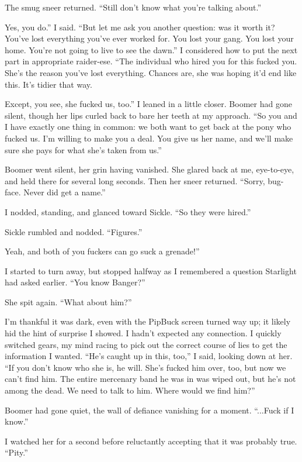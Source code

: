 The smug sneer returned. “Still don’t know what you’re talking about.”

\leavevmode{}Yes, you do.” I said. “But let me ask you another question: was it worth it? You’ve lost everything you’ve ever worked for. You lost your gang. You lost your home. You’re not going to live to see the dawn.” I considered how to put the next part in appropriate raider-ese. “The individual who hired you for this fucked you. She’s the reason you’ve lost everything. Chances are, she was hoping it’d end like this. It’s tidier that way.

\leavevmode{}Except, you see, she fucked us, too.” I leaned in a little closer. Boomer had gone silent, though her lips curled back to bare her teeth at my approach. “So you and I have exactly one thing in common: we both want to get back at the pony who fucked us. I’m willing to make you a deal. You give us her name, and we’ll make sure she pays for what she’s taken from us.”

Boomer went silent, her grin having vanished. She glared back at me, eye-to-eye, and held there for several long seconds. Then her sneer returned. “Sorry, bug-face. Never did get a name.”

I nodded, standing, and glanced toward Sickle. “So they were hired.”

Sickle rumbled and nodded. “Figures.”

\leavevmode{}Yeah, and both of you fuckers can go suck a grenade!”

I started to turn away, but stopped halfway as I remembered a question Starlight had asked earlier. “You know Banger?”

She spit again. “What about him?”

I’m thankful it was dark, even with the PipBuck screen turned way up; it likely hid the hint of surprise I showed. I hadn’t expected any connection. I quickly switched gears, my mind racing to pick out the correct course of lies to get the information I wanted. “He’s caught up in this, too,” I said, looking down at her. “If you don’t know who she is, he will. She’s fucked him over, too, but now we can’t find him. The entire mercenary band he was in was wiped out, but he’s not among the dead. We need to talk to him. Where would we find him?”

Boomer had gone quiet, the wall of defiance vanishing for a moment. “...Fuck if I know.”

I watched her for a second before reluctantly accepting that it was probably true. “Pity.”

